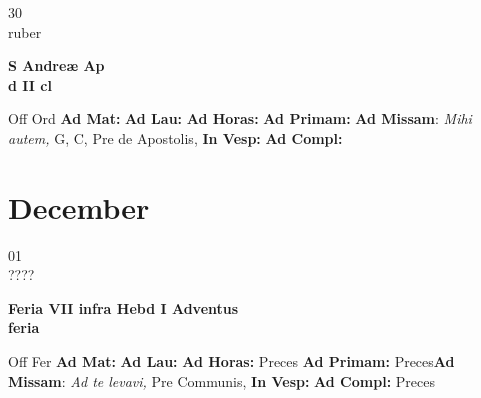 \documentclass[10pt, openany]{book}
\begin{document}
    \begin{center}
        \begin{minipage}{3.5in}
            \vspace{2em}
            \begin{minipage}{0.5in}
                {\Huge 30} \\
                {\normalsize ruber}
            \end{minipage}
            \begin{minipage}{3.0in}
                \textbf{ \large S Andreæ Ap \\
                \textnormal{\normalsize d II cl}}

            \end{minipage}
            \begin{justify}Off Ord
                \textbf{Ad Mat: }
                \textbf{Ad Lau: }
                \textbf{Ad Horas: }
                \textbf{Ad Primam: }\textbf{Ad Missam}: \textit{Mihi autem,} G, C, Pre de Apostolis, 
                \textbf{In Vesp: }
                \textbf{Ad Compl: }
            \end{justify}
        \end{minipage}
    \end{center}

    \chapter{December}
                    
    \begin{center}
        \begin{minipage}{3.5in}
            \vspace{2em}
            \begin{minipage}{0.5in}
                {\Huge 01} \\
                {\normalsize ????}
            \end{minipage}
            \begin{minipage}{3.0in}
                \textbf{ \large Feria VII infra Hebd I Adventus \\
                \textnormal{\normalsize feria}}

            \end{minipage}
            \begin{justify}Off Fer
                \textbf{Ad Mat: }
                \textbf{Ad Lau: }
                \textbf{Ad Horas: }Preces
                \textbf{Ad Primam: }Preces\textbf{Ad Missam}: \textit{Ad te levavi,} Pre Communis, 
                \textbf{In Vesp: }
                \textbf{Ad Compl: }Preces
            \end{justify}
        \end{minipage}
    \end{center}
\end{document}
